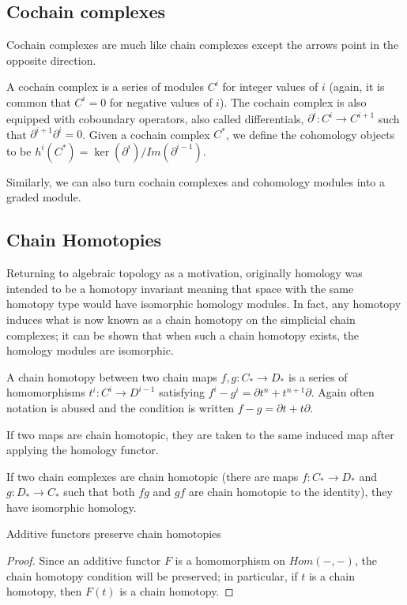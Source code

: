 \subsection{Cochain complexes}
Cochain complexes are much like chain complexes except the
arrows point in the
opposite direction.
\begin{definition} A cochain complex is a series of modules
$C^i$ for integer
values of $i$ (again, it is common that $C^i=0$ for negative
values of $i$). The
cochain complex is also equipped with coboundary operators, also
called
differentials, $\partial^i:C^i\rightarrow C^{i+1}$ such that
$\partial^{i+1}\partial^i=0$. Given a cochain complex $C^*$, we
define the
cohomology objects to be
$h^i(C^*)=\ker(\partial^i)/Im(\partial^{i-1})$.
\end{definition}
Similarly, we can also turn cochain complexes and cohomology
modules into a
graded module.

\subsection{Chain Homotopies}
Returning to algebraic topology as a motivation, originally
homology was
intended to be a homotopy invariant meaning that space with the
same homotopy
type would have isomorphic homology modules. In fact, any
homotopy induces what
is now known as a chain homotopy on the simplicial chain
complexes; it can be
shown that when such a chain homotopy exists, the homology
modules are
isomorphic.
\begin{definition} A chain homotopy between two chain maps
$f,g:C_*\rightarrow D_*$ is a series of homomorphisms
$t^i:C^i\rightarrow D^{i-1}$ satisfying $f^i-g^i=\partial t^n+
t^{n+1}\partial$. Again often notation is abused and the
condition is written $f-g=\partial t +
t\partial$.\end{definition}
\begin{theorem} If two maps are chain homotopic, they are taken
to the same induced map after applying the homology functor.
\end{theorem}
\begin{corollary} If two chain complexes are chain homotopic
(there are maps $f: C_*\rightarrow D_*$ and $g:D_*\rightarrow
C_*$ such that both $fg$ and $gf$ are chain homotopic to the
identity), they have isomorphic homology. \end{corollary}

\begin{theorem} Additive functors preserve chain homotopies
\end{theorem}
\begin{proof} Since an additive functor $F$ is a homomorphism on $Hom(-,-)$,
the chain homotopy condition will be preserved; in
particular, if $t$ is a chain homotopy, then $F(t)$ is a chain
homotopy.\end{proof}

